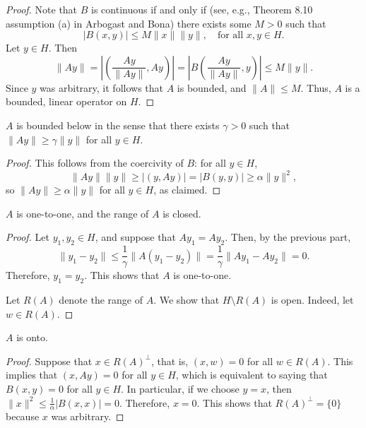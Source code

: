 \documentclass{homework}
\begin{document}
\begin{arabicparts}
\begin{proof}
			Note that $B$ is continuous if and only if (see, e.g., Theorem 8.10 assumption (a) in Arbogast and Bona) there exists some $M > 0$ such that
			\begin{equation}
				|B(x,y)| \le M\lVert x\rVert \lVert y\rVert, \quad \text{for all } x, y\in H.
			\end{equation}
			Let $y \in H$. Then
			\begin{equation}
				\lVert Ay\rVert = \left|\left(\frac{Ay}{\lVert Ay\rVert}, Ay\right)\right|=\left|B\left(\frac{Ay}{\lVert Ay\rVert},y \right)\right| \le M \lVert y\rVert.
			\end{equation}
			Since $y$ was arbitrary, it follows that $A$ is bounded, and $\lVert A \rVert \le M$. Thus, $A$ is a bounded, linear operator on $H$.
		\end{proof}
		
		\questionpart
		$A$ is bounded below in the sense that there exists $\gamma > 0$ such that $\lVert A y\rVert \ge \gamma \lVert y\rVert$ for all $y \in H$.
		\begin{proof}
			This follows from the coercivity of $B$: for all $y \in H$,
			\begin{equation}
				\lVert Ay\rVert \lVert y\rVert \ge |(y, Ay)| = |B(y, y)| \ge \alpha \lVert y \rVert^2,
			\end{equation}
			so $\lVert Ay\rVert \ge \alpha \lVert y\rVert$ for all $y \in H$, as claimed.
		\end{proof}
		
		\questionpart
		$A$ is one-to-one, and the range of $A$ is closed.
		\begin{proof}
			Let $y_1, y_2 \in H$, and suppose that $Ay_1 = Ay_2$. Then, by the previous part,
			\begin{equation}
				\lVert y_1 - y_2\rVert \le \frac{1}{\gamma}\lVert A(y_1 - y_2)\rVert = \frac{1}{\gamma}\lVert Ay_1 - Ay_2\rVert = 0.
			\end{equation}
			Therefore, $y_1 = y_2$. This shows that $A$ is one-to-one.
			
			Let $R(A)$ denote the range of $A$. We show that $H \setminus R(A)$ is open. Indeed, let $w \in R(A)$.
		\end{proof}
		
		\questionpart
		$A$ is onto.
		\begin{proof}
			Suppose that $x \in R(A)^\perp$, that is, $(x, w) = 0$ for all $w \in R(A)$. This implies that $(x, Ay) = 0$ for all $y \in H$, which is equivalent to saying that $B(x, y) = 0$ for all $y \in H$. In particular, if we choose $y = x$, then $\lVert x\rVert^2 \le \frac{1}{\alpha}|B(x, x)| = 0$. Therefore, $x = 0$. This shows that $R(A)^\perp = \{0\}$ because $x$ was arbitrary. 
			

\end{proof}
\end{arabicparts}
\end{document}
